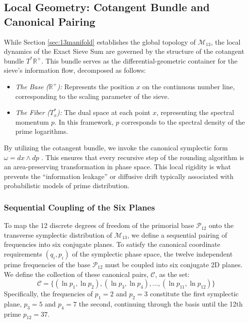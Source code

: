 \documentclass[sn-mathphys-num, pdflatex, referee]{sn-jnl}
\begin{document}
\subsection{Local Geometry: Cotangent Bundle and Canonical Pairing}
\label{sec:LocalGeometry}

While Section \ref{sec:13manifold} establishes the global topology of $\mathcal{M}_{13}$, the local dynamics of the Exact Sieve Sum are governed by the structure of the cotangent bundle $T^*\mathbb{R}^+$. This bundle serves as the differential-geometric container for the sieve's information flow, decomposed as follows:

\begin{itemize}
    \item \textit{The Base ($\mathbb{R}^+$):} Represents the position $x$ on the continuous number line, corresponding to the scaling parameter of the sieve.
    \item \textit{The Fiber ($T_x^*$):} The dual space at each point $x$, representing the spectral momentum $p$. In this framework, $p$ corresponds to the spectral density of the prime logarithms.
\end{itemize}

By utilizing the cotangent bundle, we invoke the canonical symplectic form $\omega = dx \wedge dp$ \cite{arnold1989}. This ensures that every recursive step of the rounding algorithm is an area-preserving transformation in phase space. This local rigidity is what prevents the ``information leakage'' or diffusive drift typically associated with probabilistic models of prime distribution. 

\subsubsection{Sequential Coupling of the Six Planes}
To map the 12 discrete degrees of freedom of the primorial base $\mathcal{P}_{12}$ onto the transverse symplectic distribution of $\mathcal{M}_{13}$, we define a sequential pairing of frequencies into six conjugate planes. To satisfy the canonical coordinate requirements $(q_i, p_i)$ of the symplectic phase space, the twelve independent prime frequencies of the base $\mathcal{P}_{12}$ must be coupled into six conjugate 2D planes. We define the collection of these canonical pairs, $\mathcal{C}$, as the set:
\begin{equation}
\mathcal{C} = \{ (\ln p_1, \ln p_2), (\ln p_3, \ln p_4), \dots, (\ln p_{11}, \ln p_{12}) \}
\end{equation}
Specifically, the frequencies of $p_1=2$ and $p_2=3$ constitute the first symplectic plane, $p_3=5$ and $p_4=7$ the second, continuing through the basis until the 12th prime $p_{12}=37$. 
\end{document}
